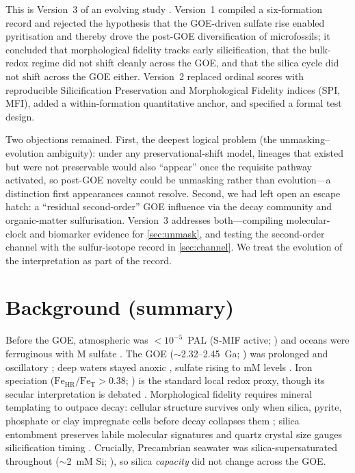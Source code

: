 \documentclass[11pt]{article}
\begin{document}
This is Version~3 of an evolving study \citep{v1,v2}. Version~1 compiled a six-formation record and
rejected the hypothesis that the GOE-driven sulfate rise enabled pyritisation and thereby drove the
post-GOE diversification of microfossils; it concluded that morphological fidelity tracks early
silicification, that the bulk-redox regime did not shift cleanly across the GOE, and that the silica
cycle did not shift across the GOE either. Version~2 replaced ordinal scores with reproducible
Silicification Preservation and Morphological Fidelity indices (SPI, MFI), added a within-formation
quantitative anchor, and specified a formal test design.

Two objections remained. First, the deepest logical problem (the unmasking--evolution ambiguity):
under any preservational-shift model, lineages that existed but were not preservable would also
``appear'' once the requisite pathway activated, so post-GOE novelty could be unmasking rather than
evolution---a distinction first appearances cannot resolve. Second, we had left open an escape
hatch: a ``residual second-order'' GOE influence via the decay community and organic-matter
sulfurisation. Version~3 addresses both---compiling molecular-clock and biomarker evidence for
\textsection\ref{sec:unmask}, and testing the second-order channel with the sulfur-isotope record in
\textsection\ref{sec:channel}. We treat the evolution of the interpretation as part of the record.

\section{Background (summary)}
Before the GOE, atmospheric  was $<10^{-5}$~PAL (S-MIF active; \citealp{Pavlov2002,Farquhar2000})
and oceans were ferruginous with \textmu M sulfate \citep{Habicht2002,Crowe2014}. The GOE
($\sim$2.32--2.45~Ga; \citealp{Bekker2004}) was prolonged and oscillatory
\citep{Lyons2014,Garduno2024}; deep waters stayed anoxic \citep{Canfield1998}, sulfate rising to mM
levels \citep{Kah2004}. Iron speciation
($\mathrm{Fe_{HR}}/\mathrm{Fe_T}>0.38$; \citealp{Poulton2005,Poulton2011}) is the standard local
redox proxy, though its secular interpretation is debated \citep{Sperling2014}. Morphological fidelity requires mineral templating to outpace decay: cellular structure
survives only when silica, pyrite, phosphate or clay impregnate cells before decay collapses them
\citep{Wacey2012}; silica entombment preserves labile molecular signatures \citep{Alleon2016silica}
and quartz crystal size gauges silicification timing \citep{Moore2025}. Crucially, Precambrian
seawater was silica-supersaturated throughout ($\sim$2~mM Si; \citealp{Siever1992,Perry2003}), so
silica \emph{capacity} did not change across the GOE.
\end{document}
